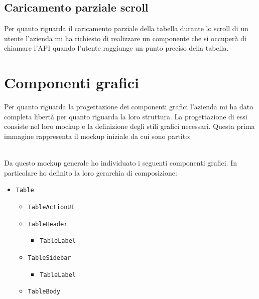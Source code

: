\subsection*{Caricamento parziale scroll}
Per quanto riguarda il caricamento parziale della tabella durante lo scroll di un utente l'azienda mi ha richiesto di realizzare un componente che si occuperà di chiamare l'API quando l'utente raggiunge un punto preciso della tabella.

\section{Componenti grafici}
Per quanto riguarda la progettazione dei componenti grafici l'azienda mi ha dato completa libertà per quanto riguarda la loro struttura. La progettazione di essi consiste nel loro mockup e la definizione degli stili grafici necessari. Questa prima immagine rappresenta il mockup iniziale da cui sono partito: \\
\begin{minipage}{\linewidth}
\end{minipage}
\mbox{} \\
Da questo mockup generale ho individuato i seguenti componenti grafici. In particolare ho definito la loro gerarchia di composizione:
\begin{itemize}
	\item \verb|Table|
	\begin{itemize}
		\item \verb|TableActionUI|
		\item \verb|TableHeader|
		\begin{itemize}
			\item \verb|TableLabel|
		\end{itemize}
		\item \verb|TableSidebar|
		\begin{itemize}
			\item \verb|TableLabel|
		\end{itemize}
		\item \verb|TableBody|
	\end{itemize}
\end{itemize}

